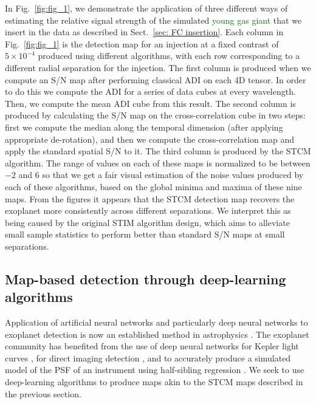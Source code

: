 \documentclass[referee]{aa} %
\newcommand{\newchange}[1]{\textcolor{darkgreen}{#1}}
\begin{document}
In Fig.~\ref{fig:fig_1}, we demonstrate the application of three different ways of estimating the relative signal strength of the simulated \newchange{young gas giant} that we insert in the data as described in Sect.~\ref{sec: FC insertion}.
Each column in Fig.~\ref{fig:fig_1} is the detection map for an injection at a fixed contrast of $5\times 10^{-4}$ produced using different algorithms, with each row corresponding to a different radial separation for the injection. %
The first column is produced when we compute an S/N map \citep[as defined in][]{2014Mawet} after performing classical ADI on each 4D tensor.
In order to do this we compute the ADI for a series of data cubes at every wavelength. Then, we compute the mean ADI cube from this result. 
The second column is produced by calculating the S/N map \citep[as defined in][]{2014Mawet} on the cross-correlation cube in two steps: first we compute the median along the temporal dimension (after applying appropriate de-rotation), and then we compute the cross-correlation map and apply the standard spatial S/N to it.
The third column is produced by the STCM algorithm.
The range of values on each of these maps is normalized to be between $-2$ and $6$ so that we get a fair visual estimation of the noise values produced by each of these algorithms, based on the global minima and maxima of these nine maps.
From the figures it appears that the STCM detection map recovers the exoplanet more consistently across different separations. We interpret this as being caused by the original STIM algorithm design, which aims to alleviate small sample statistics to perform better than standard S/N maps at small separations.

\subsection{Map-based detection through deep-learning algorithms}\label{sec:ML algorithms}

Application of artificial neural networks and particularly deep neural networks to exoplanet detection is now an established method in astrophysics \citep[][]{2020Fluke}.
The exoplanet community has benefited from the use of deep neural networks for Kepler light curves \citep{2018Pearson}, for direct imaging detection \citep{2018Gomez}, and to accurately produce a simulated model of the PSF of an instrument using half-sibling regression \citep{2022Gebhard}.
We seek to use deep-learning algorithms to produce maps akin to the STCM maps described in the previous section.
\end{document}
